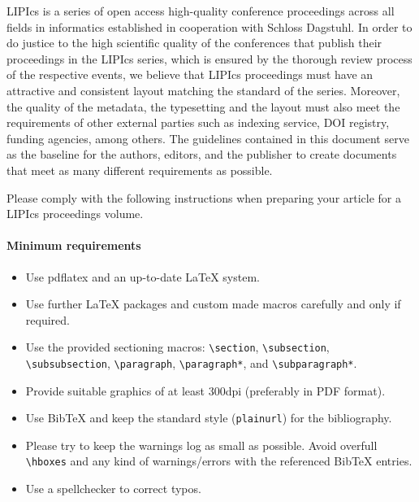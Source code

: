 \documentclass[a4paper,UKenglish,cleveref, autoref]{lipics-v2019}
\begin{document}
LIPIcs is a series of open access high-quality conference proceedings across all fields in informatics established in cooperation with Schloss Dagstuhl. 
In order to do justice to the high scientific quality of the conferences that publish their proceedings in the LIPIcs series, which is ensured by the thorough review process of the respective events, we believe that LIPIcs proceedings must have an attractive and consistent layout matching the standard of the series.
Moreover, the quality of the metadata, the typesetting and the layout must also meet the requirements of other external parties such as indexing service, DOI registry, funding agencies, among others. The guidelines contained in this document serve as the baseline for the authors, editors, and the publisher to create documents that meet as many different requirements as possible. 

Please comply with the following instructions when preparing your article for a LIPIcs proceedings volume. 
\paragraph*{Minimum requirements}

\begin{itemize}
\item Use pdflatex and an up-to-date \LaTeX{} system.
\item Use further \LaTeX{} packages and custom made macros carefully and only if required.
\item Use the provided sectioning macros: \verb+\section+, \verb+\subsection+, \verb+\subsubsection+, \linebreak \verb+\paragraph+, \verb+\paragraph*+, and \verb+\subparagraph*+.
\item Provide suitable graphics of at least 300dpi (preferably in PDF format).
\item Use BibTeX and keep the standard style (\verb+plainurl+) for the bibliography.
\item Please try to keep the warnings log as small as possible. Avoid overfull \verb+\hboxes+ and any kind of warnings/errors with the referenced BibTeX entries.
\item Use a spellchecker to correct typos.
\end{itemize}
\end{document}
